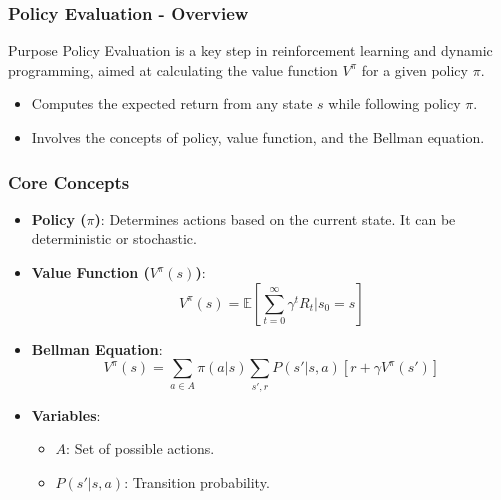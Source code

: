 \documentclass[aspectratio=169]{beamer}
\begin{document}
\begin{frame}[fragile]
    \frametitle{Policy Evaluation - Overview}
    \begin{block}{Purpose}
        Policy Evaluation is a key step in reinforcement learning and dynamic programming, aimed at calculating the value function \(V^\pi\) for a given policy \(\pi\).
    \end{block}
    
    \begin{itemize}
        \item Computes the expected return from any state \(s\) while following policy \(\pi\).
        \item Involves the concepts of policy, value function, and the Bellman equation.
    \end{itemize}
\end{frame}

\begin{frame}[fragile]
    \frametitle{Core Concepts}
    \begin{itemize}
        \item \textbf{Policy (\(\pi\))}: Determines actions based on the current state. It can be deterministic or stochastic.
        
        \item \textbf{Value Function (\(V^\pi(s)\))}:
        \begin{equation}
        V^\pi(s) = \mathbb{E}\left[\sum_{t=0}^{\infty} \gamma^t R_t | s_0 = s\right]
        \end{equation}
        
        \item \textbf{Bellman Equation}:
        \begin{equation}
        V^\pi(s) = \sum_{a \in A} \pi(a|s) \sum_{s', r} P(s'|s, a) \left[ r + \gamma V^\pi(s') \right]
        \end{equation}

        \item \textbf{Variables}:
        \begin{itemize}
            \item \(A\): Set of possible actions.
            \item \(P(s'|s, a)\): Transition probability.
        \end{itemize}
    \end{itemize}
\end{frame}
\end{document}
